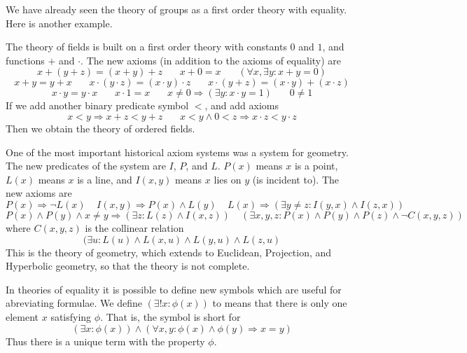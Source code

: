 We have already seen the theory of groups as a first order theory with equality. Here is another example.

\begin{example}
    The theory of fields is built on a first order theory with constants $0$ and $1$, and functions $+$ and $\cdot$. The new axioms (in addition to the axioms of equality) are
    \[ x + (y + z) = (x + y) + z\ \ \ \ \ \ \ \ x + 0 = x\ \ \ \ \ \ \ \ (\forall x, \exists y: x + y = 0) \]
    \[ x + y = y + x\ \ \ \ \ \ \ \ x \cdot (y \cdot z) = (x \cdot y) \cdot z\ \ \ \ \ \ \ \ x \cdot (y + z) = (x \cdot y) + (x \cdot z) \]
    \[ x \cdot y = y \cdot x\ \ \ \ \ \ \ \ x \cdot 1 = x\ \ \ \ \ \ \ \ x \neq 0 \Rightarrow (\exists y: x \cdot y = 1)\ \ \ \ \ \ \ \ 0 \neq 1 \]
    If we add another binary predicate symbol $<$, and add axioms
    \[ x < y \Rightarrow x + z < y + z\ \ \ \ \ \ \ \ x < y \wedge 0 < z \Rightarrow x \cdot z< y \cdot z \]
    Then we obtain the theory of ordered fields.
\end{example}

\begin{example}
    One of the most important historical axiom systems was a system for geometry. The new predicates of the system are $I$, $P$, and $L$. $P(x)$ means $x$ is a point, $L(x)$ means $x$ is a line, and $I(x,y)$ means $x$ lies on $y$ (is incident to). The new axioms are
    \[ P(x) \Rightarrow \neg L(x)\ \ \ \ \ I(x,y) \Rightarrow P(x) \wedge L(y)\ \ \ \ \ L(x) \Rightarrow (\exists y \neq z: I(y,x) \wedge I(z,x)) \]
    \[ P(x) \wedge P(y) \wedge x \neq y \Rightarrow (\exists z: L(z) \wedge I(x,z))\ \ \ \ \ (\exists x,y,z: P(x) \wedge P(y) \wedge P(z) \wedge \neg C(x,y,z)) \]
    where $C(x,y,z)$ is the collinear relation
    \[ (\exists u: L(u) \wedge L(x,u) \wedge L(y,u) \wedge L(z,u) \]
    This is the theory of geometry, which extends to Euclidean, Projection, and Hyperbolic geometry, so that the theory is not complete.
\end{example}

In theories of equality it is possible to define new symbols which are useful for abreviating formulae. We define $(\exists ! x: \phi(x))$ to means that there is only one element $x$ satisfying $\phi$. That is, the symbol is short for
%
\[ (\exists x: \phi(x)) \wedge (\forall x,y: \phi(x) \wedge \phi(y) \Rightarrow x = y) \]
%
Thus there is a unique term with the property $\phi$.

